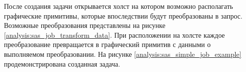 После создания задачи открывается холст на котором возможно располагать графические примитивы, которые впоследствии 
будут преобразованы в запрос. %
Возможные преобразования представлены на рисунке \ref{analysis:sas_job_transform_data}. 
При расположении на холсте каждое преобразование превращается в графический 
примитив с данными о выполняемом преобразовании.
На рисунке \ref{analysis:sas_simple_job_example} продемонстрирована созданная задача.

\begin{figure}[ht!]
\end{figure}

\begin{figure}[ht!]
\end{figure}

